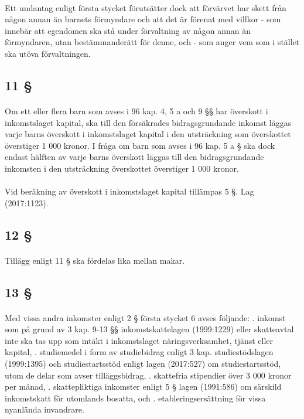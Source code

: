 \documentclass[a4paper,notitlepage,openany,10pt]{book}
\begin{document}
\paragraph*{}
Ett undantag enligt första stycket förutsätter dock att förvärvet har skett från någon annan än barnets förmyndare och att det är förenat med villkor
\newline - som innebär att egendomen ska stå under förvaltning av någon annan än förmyndaren, utan bestämmanderätt för denne, och
\newline - som anger vem som i stället ska utöva förvaltningen.
\subsection*{11 §}
\paragraph*{}
Om ett eller flera barn som avses i 96 kap. 4, 5 a och 9 §§ har överskott i inkomstslaget kapital, ska till den försäkrades bidragsgrundande inkomst läggas varje barns överskott i inkomstslaget kapital i den utsträckning som överskottet överstiger 1 000 kronor. I fråga om barn som avses i 96 kap. 5 a § ska dock endast hälften av varje barns överskott läggas till den bidragsgrundande inkomsten i den utsträckning överskottet överstiger 1 000 kronor.
\paragraph*{}
Vid beräkning av överskott i inkomstslaget kapital tillämpas 5 §.
Lag (2017:1123).
\subsection*{12 §}
\paragraph*{}
Tillägg enligt 11 § ska fördelas lika mellan makar.
\subsection*{13 §}
\paragraph*{}
Med vissa andra inkomster enligt 2 § första stycket 6 avses följande:
. inkomst som på grund av 3 kap. 9-13 §§ inkomstskattelagen (1999:1229) eller skatteavtal inte ska tas upp som intäkt i inkomstslaget näringsverksamhet, tjänst eller kapital,
. studiemedel i form av studiebidrag enligt 3 kap. studiestödslagen (1999:1395) och studiestartsstöd enligt lagen (2017:527) om studiestartsstöd, utom de delar som avser tilläggsbidrag,
. skattefria stipendier över 3 000 kronor per månad,
. skattepliktiga inkomster enligt 5 § lagen (1991:586) om särskild inkomstskatt för utomlands bosatta, och
. etableringsersättning för vissa nyanlända invandrare.
\end{document}
